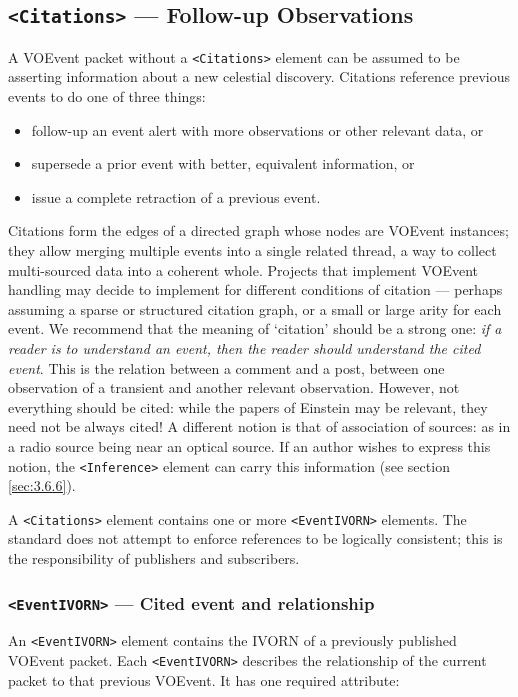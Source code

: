 \documentclass[11pt,a4paper]{ivoa}
\begin{document}
\subsection{\texttt{<Citations>} --- Follow-up Observations}
\label{sec:3.7}
A VOEvent packet without a \verb|<Citations>| element can be assumed to be
asserting information about a new celestial discovery. Citations reference
previous events to do one of three things:
\begin{itemize}
\item follow-up an event alert with more observations or other relevant data, or
\item supersede a prior event with better, equivalent information, or
\item issue a complete retraction of a previous event.
\end{itemize}

Citations form the edges of a directed graph whose nodes are VOEvent instances;
they allow merging multiple events into a single related thread, a way to
collect multi-sourced data into a coherent whole. Projects that implement
VOEvent handling may decide to implement for different conditions of citation
--- perhaps assuming a sparse or structured citation graph, or a small or large
arity for each event. We recommend that the meaning of `citation' should be a
strong one: \emph{if a reader is to understand an event, then the reader should
understand the cited event}. This is the relation between a comment and a post,
between one observation of a transient and another relevant observation.
However, not everything should be cited: while the papers of Einstein may be
relevant, they need not be always cited! A different notion is that of
association of sources: as in a radio source being near an optical source. If an
author wishes to express this notion, the \verb|<Inference>| element can carry
this information (see section \ref{sec:3.6.6}).

A \verb|<Citations>| element contains one or more \verb|<EventIVORN>| elements.
The standard does not attempt to enforce references to be logically consistent;
this is the responsibility of publishers and subscribers.

\subsubsection{\texttt{<EventIVORN>} --- Cited event and relationship}
\label{sec:3.7.1}

An \verb|<EventIVORN>| element contains the IVORN of a previously published
VOEvent packet. Each \verb|<EventIVORN>| describes the relationship of the
current packet to that previous VOEvent. It has one required attribute:
\end{document}
